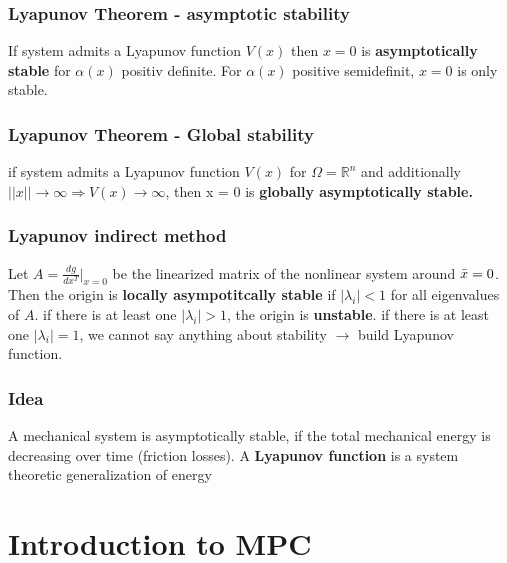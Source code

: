 \subsubsection{Lyapunov Theorem - asymptotic stability}
If system admits a Lyapunov function $V(x)$ then $x = 0$ is \textbf{asymptotically stable} for $\alpha(x)$ positiv definite. For $\alpha(x)$ positive semidefinit, $x=0$ is only stable.
\subsubsection{Lyapunov Theorem - Global stability}
if system admits a Lyapunov function $V(x)$ for $\Omega = \mathbb{R}^n$ and additionally $||x|| \rightarrow \infty \Rightarrow V(x) \rightarrow\infty$, then x = 0 is \textbf{globally asymptotically stable.}
\subsubsection{Lyapunov indirect method}
Let $A = \frac{dg}{dx^T}{\Big|}_{x=0}$ be the linearized matrix of the nonlinear system around $\Bar{x}=0$.
Then the origin is \textbf{locally asympotitcally stable} if $|\lambda_i|<1$ for all eigenvalues of $A$. if there is at least one $|\lambda_i|>1$, the origin is \textbf{unstable}. if there is at least one $|\lambda_i|=1$, we cannot say anything about stability $\rightarrow$ build Lyapunov function.
\subsubsection{Idea}
 A mechanical system is asymptotically stable, if the total mechanical energy is decreasing over time (friction losses). A \textbf{Lyapunov function} is a system theoretic generalization of energy
\section{Introduction to MPC} 

